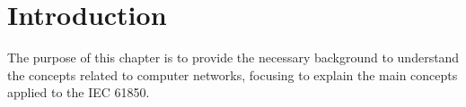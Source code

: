 \section{Introduction}

The purpose of this chapter is to provide the necessary background 
 to understand the concepts related to computer networks, 
focusing to explain the main concepts applied to the IEC 61850. 


